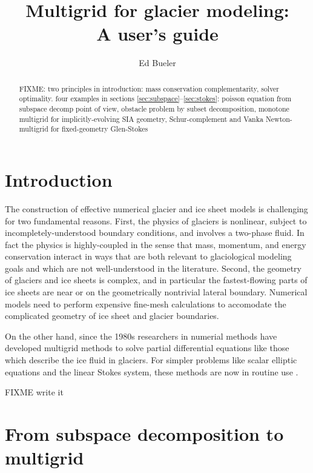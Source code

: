 \documentclass[letterpaper,final,12pt,reqno]{amsart}
\begin{document}
\title[Multigrid for glacier modeling]{Multigrid for glacier modeling: \\ A user's guide}

\author{Ed Bueler}

\begin{abstract} FIXME: two principles in introduction: mass conservation complementarity, solver optimality.  four examples in sections \ref{sec:subspace}--\ref{sec:stokes}: poisson equation from subspace decomp point of view, obstacle problem by subset decomposition, monotone multigrid for implicitly-evolving SIA geometry, Schur-complement and Vanka Newton-multigrid for fixed-geometry Glen-Stokes
\end{abstract}

\maketitle

\thispagestyle{empty}
\bigskip

\section{Introduction} \label{sec:intro}

The construction of effective numerical glacier and ice sheet models is challenging for two fundamental reasons.  First, the physics of glaciers is nonlinear, subject to incompletely-understood boundary conditions, and involves a two-phase fluid.  In fact the physics is highly-coupled in the sense that mass, momentum, and energy conservation interact in ways that are both relevant to glaciological modeling goals and which are not well-understood in the literature.  Second, the geometry of glaciers and ice sheets is complex, and in particular the fastest-flowing parts of ice sheets are near or on the geometrically nontrivial lateral boundary.  Numerical models need to perform expensive fine-mesh calculations to accomodate the complicated geometry of ice sheet and glacier boundaries.

On the other hand, since the 1980s researchers in numerial methods have developed multigrid methods to solve partial differential equations like those which describe the ice fluid in glaciers.   For simpler problems like scalar elliptic equations and the linear Stokes system, these methods are now in routine use \cite{Briggsetal2000,Bueler2021,Trottenbergetal2001}.

FIXME write it


\section{From subspace decomposition to multigrid} \label{sec:subspace}
\end{document}
